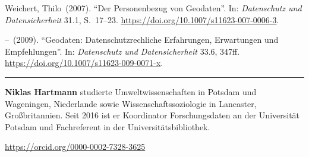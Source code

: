 \documentclass[a4paper,
fontsize=11pt,
oneside,
numbers=noperiodatend,
parskip=half-,
bibliography=totoc,
final
]{scrartcl}
\begin{document}
Weichert, Thilo~(2007). \enquote{Der Personenbezug von Geodaten}. In:
\emph{Datenschutz und Datensicherheit} 31.1, S.~17--23.
\url{https://doi.org/10.1007/s11623-007-0006-3}.

--~(2009). \enquote{Geodaten: Datenschutzrechliche Erfahrungen,
Erwartungen und Empfehlungen}. In: \emph{Datenschutz und
Datensicherheit} 33.6, 347ff.
\url{https://doi.org/10.1007/s11623-009-0071-x}.

\begin{center}\rule{0.5\linewidth}{0.5pt}\end{center}

\textbf{Niklas Hartmann} studierte Umweltwissenschaften in Potsdam und
Wageningen, Niederlande sowie Wissenschaftssoziologie in Lancaster,
Großbritannien. Seit 2016 ist er Koordinator Forschungsdaten an der
Universität Potsdam und Fachreferent in der Universitätsbibliothek.

\url{https://orcid.org/0000-0002-7328-3625}
\end{document}
